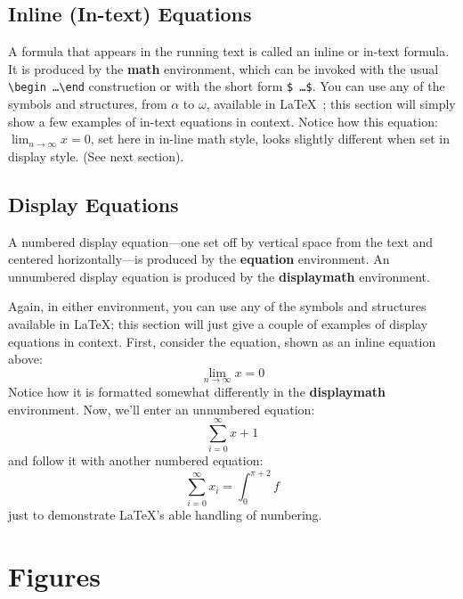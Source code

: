 \documentclass[screen, sigcconf]{timtm}
\begin{document}
\subsection{Inline (In-text) Equations}
A formula that appears in the running text is called an inline or
in-text formula.  It is produced by the \textbf{math} environment,
which can be invoked with the usual
\texttt{{\textbackslash}begin\,\ldots{\textbackslash}end} construction or with
the short form \texttt{\$\,\ldots\$}. You can use any of the symbols
and structures, from $\alpha$ to $\omega$, available in
\LaTeX~\cite{Lamport:LaTeX}; this section will simply show a few
examples of in-text equations in context. Notice how this equation:
\begin{math}
  \lim_{n\rightarrow \infty}x=0
\end{math},
set here in in-line math style, looks slightly different when
set in display style.  (See next section).

\subsection{Display Equations}
A numbered display equation---one set off by vertical space from the
text and centered horizontally---is produced by the \textbf{equation}
environment. An unnumbered display equation is produced by the
\textbf{displaymath} environment.

Again, in either environment, you can use any of the symbols and
structures available in \LaTeX\@; this section will just give a couple
of examples of display equations in context.  First, consider the
equation, shown as an inline equation above:
\begin{equation}
  \lim_{n\rightarrow \infty}x=0
\end{equation}
Notice how it is formatted somewhat differently in
the \textbf{displaymath}
environment.  Now, we'll enter an unnumbered equation:
\begin{displaymath}
  \sum_{i=0}^{\infty} x + 1
\end{displaymath}
and follow it with another numbered equation:
\begin{equation}
  \sum_{i=0}^{\infty}x_i=\int_{0}^{\pi+2} f
\end{equation}
just to demonstrate \LaTeX's able handling of numbering.

\section{Figures}
\end{document}

